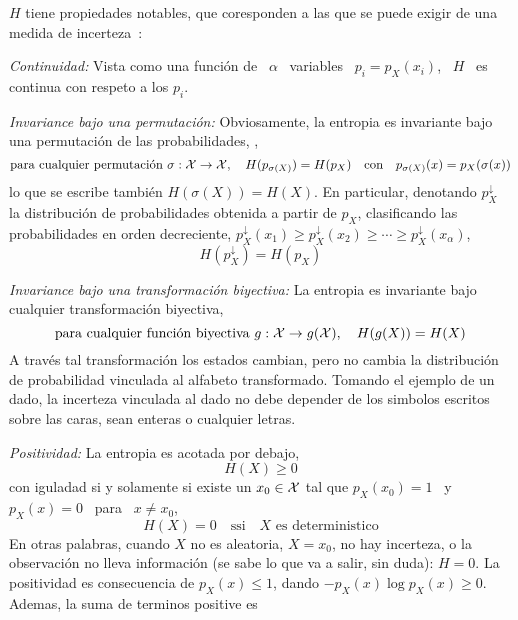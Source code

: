 $H$ tiene propiedades notables, que coresponden a las que se puede exigir de una
medida de incerteza~\cite{Sha48, ShaWea64, CovTho06, Rio07, DemCov91, Joh04}:
%
\begin{propiedades}
\item\label{prop:SZ:continuidad} {\it Continuidad:}  Vista como una funci\'on de
  \ $\alpha$ \ variables  \ $p_i = p_X(x_i)$, \ $H$ \  es continua con respeto a
  los $p_i$.
%
\setcounter{PropPermutacion}{\value{enumi}}
\item\label{prop:SZ:permutacion}   {\it  Invariance  bajo   una  permutaci\'on:}
  Obviosamente,  la  entropia  es  invariante  bajo  una  permutaci\'on  de  las
  probabilidades, \ie,
  \[
  \mbox{para cualquier  permutaci\'on } \sigma:  \mathcal{X} \to \mathcal{X}, \quad  H(p_{\sigma(X)}) =
  H(p_X) \quad \mbox{con} \quad p_{\sigma(X)}(x) = p_X(\sigma(x))
  \]
  lo que se  escribe tambi\'en $H(\sigma(X)) = H(X)$.   En particular, denotando
  $p_X^\downarrow$ la  distribuci\'on de probabilidades obtenida a  partir de $p_X$,
  clasificando las  probabilidades en orden  decreciente, $p_X^\downarrow(x_1) \ge
  p_X^\downarrow(x_2) \ge \cdots  \ge p_X^\downarrow(x_\alpha)$,
  \[
  H(p_X^\downarrow) = H(p_X)
  \]
%
\setcounter{PropBiyeccion}{\value{enumi}}
\item\label{prop:SZ:biyeccion}   {\it  Invariance   bajo   una  transformaci\'on
    biyectiva:}  La  entropia  es  invariante  bajo  cualquier  transformaci\'on
  biyectiva, \ie
  \[
  \mbox{para cualquier  funci\'on biyectiva } g:  \mathcal{X} \to g(\mathcal{X}),  \quad H(g(X)) =
  H(X)
  \]
  A  trav\'es  tal transformaci\'on  los  estados  cambian,  pero no  cambia  la
  distribuci\'on de probabilidad vinculada al alfabeto transformado.  Tomando el
  ejemplo de  un dado, la  incerteza vinculada al  dado no debe depender  de los
  simbolos escritos sobre las caras, sean enteras o cualquier letras.
%
\item\label{prop:SZ:positividad} {\it  Positividad:} La entropia  es acotada por
  debajo,
  \[
  H(X) \ge 0 
  \]
  con iguladad si y solamente si existe un $x_0 \in \mathcal{X}$ tal que $p_X(x_0) = 1$ \
  y \  $p_X(x) = 0$ \ para  \ $x \ne x_0$,
  \[
  H(X)  =  0 \quad  \mbox{ssi}  \quad X  \mbox{  es  deterministico}
  \]
  En  otras  palabras, cuando  $X$  no  es aleatoria,  \ie  $X  =  x_0$, no  hay
  incerteza, o  la observaci\'on  no lleva  informaci\'on (se sabe  lo que  va a
  salir, sin duda): $H = 0$.   La positividad es consecuencia de $p_X(x) \le 1$,
  dando $- p_X(x)  \log p_X(x) \ge 0$.  Ademas, la suma  de terminos positive es

\end{propiedades}
